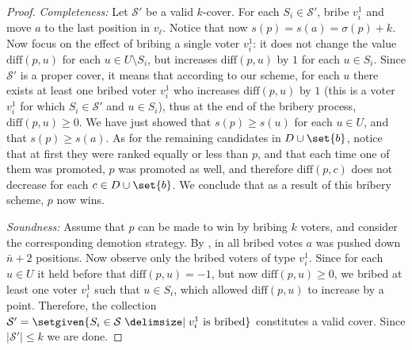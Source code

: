 \documentclass[letterpaper]{article} %
\newcommand{\SC}{\textsc{Set Cover}}
\newcommand{\SB}{\textsc{TNC}}
\newcommand{\ora}[1]{\overrightarrow{#1}}
\newcommand{\abs}[1]{\lvert{#1}\rvert}
\newcommand{\diff}{\mathrm{diff}}
\begin{document}
\begin{proof}
\textit{Completeness:} Let $\mathcal{S}'$ be a valid $k$-cover. For each $S_i \in \mathcal{S}'$, bribe $v_i^1$ and move $a$ to the last position in $v_\ell$. Notice that now $s(p) =s(a) = \sigma(p)+k$. Now focus on the effect of bribing a single voter $v_i^1$:  it does not change the value $\diff(p,u)$ for each $u \in U\setminus S_i$, but increases $\diff(p,u)$ by $1$ for each $u \in S_i$. Since $\mathcal{S}'$  is a proper cover, it means that according to our scheme, for each $u$ there exists at least one bribed voter $v_i^1$  who  increases $\diff(p,u)$ by $1$ (this is a voter $v_i^1$ for which $S_i \in \mathcal{S}'$ and $u \in S_i$), thus at the end of the bribery process, $\diff(p,u) \geq 0$. We have just showed that $s(p) \geq s(u)$ for each $u \in U$, and that $s(p) \geq s(a)$. As for the remaining candidates in $D \cup \set{b}$, notice that at first they were ranked equally or less than $p$, and that each time one of them was promoted, $p$ was promoted as well, and therefore $\diff(p,c)$ does not decrease for each $c \in D \cup \set{b}$. We conclude that as a result of this bribery scheme, $p$ now wins.

\textit{Soundness:} Assume that $p$ can be made to win by bribing $k$ voters, and consider the corresponding demotion strategy. By , in all bribed votes  $a$ was pushed down $\bar{n}+2$ positions. Now observe only the bribed voters of type $v_i^1$. Since  for each $u \in U$ it held before that $\diff(p, u) = -1$, but now $\diff(p, u) \geq 0$, we bribed at least one voter $v_i^1$ such that $u \in S_i$, which allowed $\diff(p, u)$ to increase by a point. Therefore, the collection $\mathcal{S}' = \setgiven{S_i \in \mathcal{S} \given v_i^1 \text{ is bribed}}$ constitutes a valid cover. Since $\abs{\mathcal{S}'} \leq k$
we are done.
\end{proof}



\end{document}
